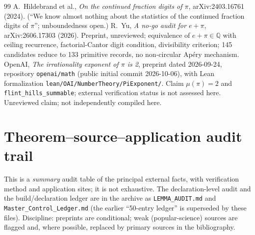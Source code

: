 \documentclass[11pt]{amsart}
\theoremstyle{definition}
\theoremstyle{remark}
\numberwithin{equation}{section}
\newcommand{\Q}{\mathbb{Q}}
\newcommand{\irr}{\mu}
\begin{document}
\begin{thebibliography}{99}
 A.~Hildebrand et al., \emph{On the continued fraction digits of $\pi$}, arXiv:2403.16761 (2024). (``We know almost nothing about the statistics of the continued fraction digits of $\pi$''; unboundedness open.)
 R.~Yu, \emph{A no-go audit for $e+\pi$}, arXiv:2606.17303 (2026). Preprint, unreviewed; equivalence of $e+\pi\in\Q$ with ceiling recurrence, factorial-Cantor digit condition, divisibility criterion; 145 candidates reduce to 133 primitive records, no non-circular Ap\'ery mechanism.
 OpenAI, \emph{The irrationality exponent of $\pi$ is 2}, preprint dated 2026-09-24, repository \texttt{openai/math} (public initial commit 2026-10-06), with Lean formalization \texttt{lean/OAI/NumberTheory/PiExponent/}. Claim $\irr(\pi)=2$ and \texttt{flint\_hills\_summable}; external verification status is not assessed here. Unreviewed claim; not independently compiled here.

\end{thebibliography}

\appendix

\section{Theorem--source--application audit trail}\label{app:audit}

This is a \emph{summary} audit table of the principal external facts, with verification method and application sites; it is not exhaustive. The declaration-level audit and the build/declaration ledger are in the archive as \texttt{LEMMA\_AUDIT.md} and \texttt{Master\_Control\_Ledger.md} (the earlier ``50-entry ledger'' is superseded by these files). Discipline: preprints are conditional; weak (popular-science) sources are flagged and, where possible, replaced by primary sources in the bibliography.
\end{document}

